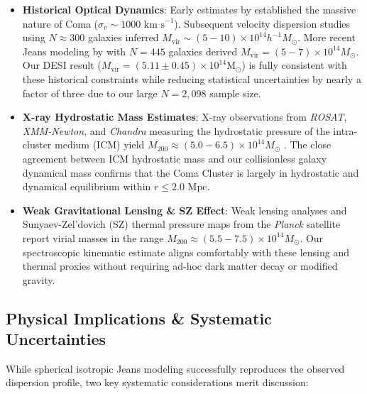 \documentclass[twocolumn]{aastex631}
\begin{document}
\begin{itemize}
	\item \textbf{Historical Optical Dynamics}: Early estimates by \citet{zwicky1933} established the massive nature of Coma ($\sigma_v \sim 1000 \text{ km s}^{-1}$). Subsequent velocity dispersion studies using $N \approx 300$ galaxies \citep{kent1982} inferred $M_{\text{vir}} \sim (5 - 10) \times 10^{14} h^{-1} M_\odot$. More recent Jeans modeling by \citet{lokas2003} with $N=445$ galaxies derived $M_{\text{vir}} = (5 - 7) \times 10^{14} M_\odot$. Our DESI result ($M_{\text{vir}} = (5.11 \pm 0.45) \times 10^{14} \mathrm{M}_\odot$) is fully consistent with these historical constraints while reducing statistical uncertainties by nearly a factor of three due to our large $N=2,098$ sample size.

	\item \textbf{X-ray Hydrostatic Mass Estimates}: X-ray observations from \textit{ROSAT}, \textit{XMM-Newton}, and \textit{Chandra} measuring the hydrostatic pressure of the intra-cluster medium (ICM) yield $M_{200} \approx (5.0 - 6.5) \times 10^{14} M_\odot$ \citep[e.g.,][]{reiprich2002, falco2014}. The close agreement between ICM hydrostatic mass and our collisionless galaxy dynamical mass confirms that the Coma Cluster is largely in hydrostatic and dynamical equilibrium within $r \le 2.0 \text{ Mpc}$.

	\item \textbf{Weak Gravitational Lensing \& SZ Effect}: Weak lensing analyses \citep[e.g.,][]{okabe2010} and Sunyaev-Zel'dovich (SZ) thermal pressure maps from the \textit{Planck} satellite \citep{planck2014} report virial masses in the range $M_{200} \approx (5.5 - 7.5) \times 10^{14} M_\odot$. Our spectroscopic kinematic estimate aligns comfortably with these lensing and thermal proxies without requiring ad-hoc dark matter decay or modified gravity.
\end{itemize}

\subsection{Physical Implications \& Systematic Uncertainties}

While spherical isotropic Jeans modeling successfully reproduces the observed dispersion profile, two key systematic considerations merit discussion:
\end{document}
